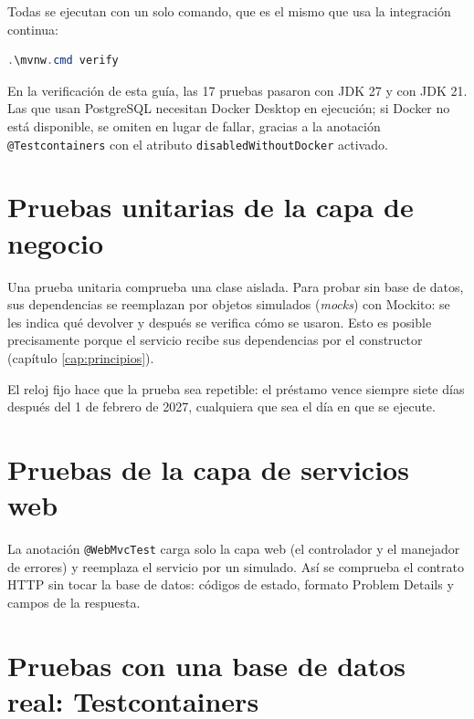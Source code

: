 Todas se ejecutan con un solo comando, que es el mismo que usa la integración continua:

\begin{lstlisting}[language=powershell,numbers=none]
.\mvnw.cmd verify
\end{lstlisting}

En la verificación de esta guía, las 17 pruebas pasaron con JDK 27 y con JDK 21. Las que usan PostgreSQL necesitan Docker Desktop en ejecución; si Docker no está disponible, se omiten en lugar de fallar, gracias a la anotación \texttt{@Testcontainers} con el atributo \texttt{disabledWithoutDocker} activado.

\section{Pruebas unitarias de la capa de negocio}

Una prueba unitaria comprueba una clase aislada. Para probar  sin base de datos, sus dependencias se reemplazan por objetos simulados (\emph{mocks}) con Mockito: se les indica qué devolver y después se verifica cómo se usaron. Esto es posible precisamente porque el servicio recibe sus dependencias por el constructor (capítulo \ref{cap:principios}).



El reloj fijo hace que la prueba sea repetible: el préstamo vence siempre siete días después del 1 de febrero de 2027, cualquiera que sea el día en que se ejecute.

\section{Pruebas de la capa de servicios web}

La anotación \texttt{@WebMvcTest} carga solo la capa web (el controlador y el manejador de errores) y reemplaza el servicio por un simulado. Así se comprueba el contrato HTTP sin tocar la base de datos: códigos de estado, formato Problem Details y campos de la respuesta.



\section{Pruebas con una base de datos real: Testcontainers}


